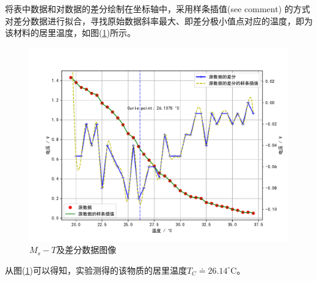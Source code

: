 \documentclass[a4paper]{article}
\begin{document}
将表中数据和对数据的差分绘制在坐标轴中，采用样条插值(see comment) %
的方式对差分数据进行拟合，寻找原始数据斜率最大、即差分极小值点对应的温度，即为该材料的居里温度，如图(\ref{data:fig})所示。
\begin{figure}[H]
\centering
\includegraphics[width=\textwidth]{fig/data.pdf}
\caption{$M_s - T$及差分数据图像}\label{data:fig}
\end{figure}

从图(\ref{data:fig})可以得知，实验测得的该物质的居里温度$T_C\doteq 26.14 ^{\circ}$C。
\end{document}
